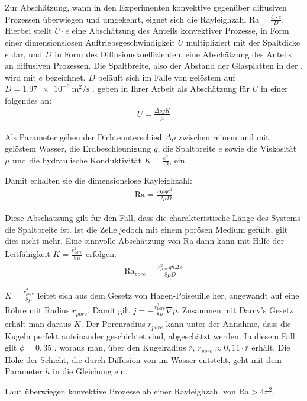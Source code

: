 Zur Abschätzung, wann in den \HSCsm Experimenten konvektive gegenüber diffusiven Prozessen überwiegen und umgekehrt, eignet sich die Rayleighzahl $\mathrm{Ra} = \frac{U \cdot e}{D}$. Hierbei stellt $U \cdot e$ eine Abschätzung des Anteils konvektiver Prozesse, in Form einer dimensionslosen Auftriebsgeschwindigkeit $U$ multipliziert mit der Spaltdicke $e$ dar, und $D$ in Form des Diffusionskoeffizienten, eine Abschätzung des Anteils an diffusiven Prozessen. Die Spaltbreite, also der Abstand der Glasplatten in der \HSCn, wird mit $e$ bezeichnet.
$D$ beläuft sich im Falle von gelöstem \COT auf $D = \SI{1,97e-9}{\meter\squared\per\second}$ \citep{frank}.
\cite{fernandez} geben in Ihrer Arbeit als Abschätzung für $U$ in einer \HSC folgendes an:
\begin{align}
 U = \frac{\Delta\rho g K}{\mu}
 \label{eq:U}
\end{align}

Als Parameter gehen der Dichteunterschied $\Delta\rho$ zwischen reinem und mit \COT gelöstem Wasser, die Erdbeschleunigung $g$, die Spaltbreite $e$ sowie die Viskosität $\mu$ und die hydraulische Konduktivität $K = \frac{e^2}{12}$, ein.

Damit erhalten sie die dimensionslose Rayleighzahl:
\begin{align}
 \mathrm{Ra} = \frac{\Delta\rho g e^3}{12 \mu D}
 \label{eq:Ra1}
\end{align}

Diese Abschätzung gilt für den Fall, dass die charakteristische Länge des Systems die Spaltbreite ist. Ist die Zelle jedoch mit einem porösen Medium gefüllt, gilt dies nicht mehr.
Eine sinnvolle Abschätzung von Ra dann kann mit Hilfe der Leitfähigkeit $K = \frac{r_{pore}^2}{8\mu}$ erfolgen:
\begin{align}
 \mathrm{Ra}_{pore} = \frac{r_{pore}^2 g h \Delta \rho}{8 \mu D}
 \label{eq:Ra2}
\end{align}

$K = \frac{r_{pore}^2}{8\mu}$ leitet sich aus dem Gesetz von Hagen-Poiseuille her, angewandt auf eine Röhre mit Radius $r_{pore}$. Damit gilt $j = -\frac{r_{pore}^2}{8\mu} \nabla p$. Zusammen mit Darcy's Gesetz erhält man daraus $K$. Der Porenradius $r_{pore}$ kann unter der Annahme, dass die Kugeln perfekt aufeinander geschichtet sind, abgeschätzt werden. In diesem Fall gilt $\phi=0,35$ \citep{song}, woraus man, über den Kugelradius $\bar{r}$, $r_{pore} \approx 0,11 \cdot \bar{r}$ erhält.
Die Höhe der Schicht, die durch Diffusion von \COT im Wasser entsteht, geht mit dem Parameter $h$ in die Gleichung ein.

Laut \cite{kneafsy} überwiegen konvektive Prozesse ab einer Rayleighzahl von \mbox{$\mathrm{Ra} > 4\pi^2$}.
